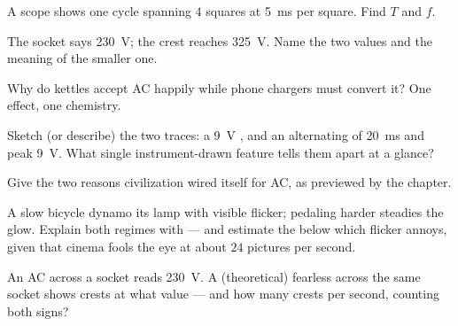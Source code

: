\begin{exercise}[$\star$]\label{exo:g9:alternating-current:4}
A scope shows one cycle spanning $4$ squares at
\qty{5}{ms} per square. Find $T$ and $f$.
\end{exercise}

\begin{exercise}[$\star$]\label{exo:g9:alternating-current:5}
The socket says \qty{230}{V}; the crest reaches
\qty{325}{V}. Name the two values and the meaning of the
smaller one.
\end{exercise}

\begin{exercise}[$\star$]\label{exo:g9:alternating-current:6}
Why do kettles accept AC happily while phone chargers must
convert it? One effect, one chemistry.
\end{exercise}

\begin{exercise}[$\star$]\label{exo:g9:alternating-current:7}
Sketch (or describe) the two traces: a \qty{9}{V} ,
and an alternating  of  \qty{20}{ms} and peak
\qty{9}{V}. What single instrument-drawn feature tells them
apart at a glance?
\end{exercise}

\begin{exercise}[$\star$]\label{exo:g9:alternating-current:8}
Give the two reasons civilization wired itself for AC, as
previewed by the chapter.
\end{exercise}

\begin{exercise}[$\star\star$]\label{exo:g9:alternating-current:9}
A slow bicycle dynamo  its lamp with visible flicker;
pedaling harder steadies the glow. Explain both regimes with
 --- and estimate the  below which
flicker annoys, given that cinema fools the eye at about
$24$ pictures per second.
\end{exercise}

\begin{exercise}[$\star\star$]\label{exo:g9:alternating-current:10}
An AC  across a socket reads \qty{230}{V}. A
(theoretical) fearless  across the same socket
shows crests at what value --- and how many crests per
second, counting both signs?
\end{exercise}

